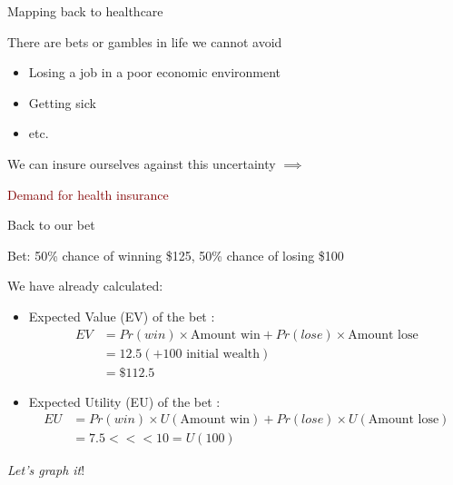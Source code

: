 \begin{frame}{Mapping back to healthcare}

    There are bets or gambles in life we cannot avoid
    \begin{itemize}
        \item Losing a job in a poor economic environment
        \item Getting sick
        \item etc.
    \end{itemize}
    \vspace{5mm}

    We can insure ourselves against this uncertainty $\implies$ 

\end{frame}
\begin{frame}{}

    \begin{center}
        \Large \textcolor{maroon}{Demand for health insurance}
    \end{center}
\end{frame}
\begin{frame}{Back to our bet}

    Bet: 50\% chance of winning \$125, 50\% chance of losing \$100
    \vspace{5mm}

    We have already calculated:
    \begin{itemize}
       \item Expected Value (EV) of the bet :
            \begin{align*}
                EV &= Pr(win) \times \text{Amount win} + Pr(lose) \times \text{Amount lose}\\
                &= 12.5 (+100\text{ initial wealth})\\
                &= \$112.5
            \end{align*}
        \item Expected Utility (EU) of the bet :
            \begin{align*}
                EU &= Pr(win) \times U(\text{Amount win})+ Pr(lose) \times U(\text{Amount lose})\\
                &= 7.5 <<< 10 = U(100)
            \end{align*}
    \end{itemize}
    \pause
    \textit{Let's graph it}!
\end{frame}
